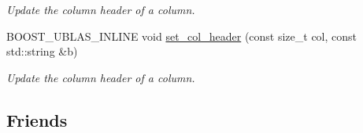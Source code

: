 \begin{DoxyCompactItemize}
\begin{DoxyCompactList}\small\item\em Update the column header of a column. \end{DoxyCompactList}\item 
B\+O\+O\+S\+T\+\_\+\+U\+B\+L\+A\+S\+\_\+\+I\+N\+L\+I\+NE void \hyperlink{classboost_1_1numeric_1_1ublas_1_1data__frame_ac8a7839759c8d97cd90676228ef1bc8c}{set\+\_\+col\+\_\+header} (const size\+\_\+t col, const std\+::string \&b)
\begin{DoxyCompactList}\small\item\em Update the column header of a column. \end{DoxyCompactList}\end{DoxyCompactItemize}
\subsection*{Friends}
